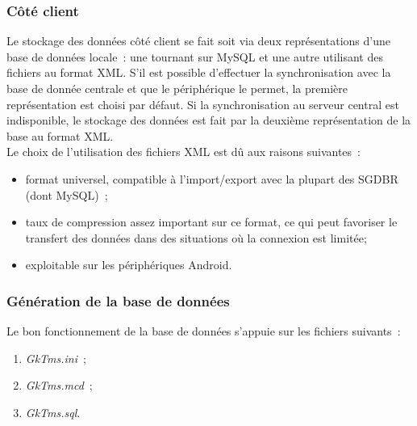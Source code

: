 \subsubsection{Côté client}
Le stockage des données côté client se fait soit via deux représentations d'une base de données locale~: une tournant sur MySQL et une autre utilisant des fichiers au format XML.
S'il est possible d'effectuer la synchronisation avec la base de donnée centrale et que le périphérique le permet, la première représentation est choisi par défaut.
Si la synchronisation au serveur central est indisponible, le stockage des données est fait par la deuxième représentation de la base au format XML.
\\
Le choix de l'utilisation des fichiers XML est dû aux raisons suivantes~:
\begin{itemize}
	\item format universel, compatible à l'import/export avec la plupart des SGDBR (dont MySQL)~;
	\item taux de compression assez important sur ce format, ce qui peut favoriser le transfert des données dans des situations où la connexion est limitée;
	\item exploitable sur les périphériques Android.
\end{itemize}

\subsubsection{Génération de la base de données}
Le bon fonctionnement de la base de données s'appuie sur les fichiers suivants~:
\begin{enumerate}
	\item \emph{GkTms.ini}~;
	\item \emph{GkTms.mcd}~;
	\item \emph{GkTms.sql}.
\end{enumerate}

